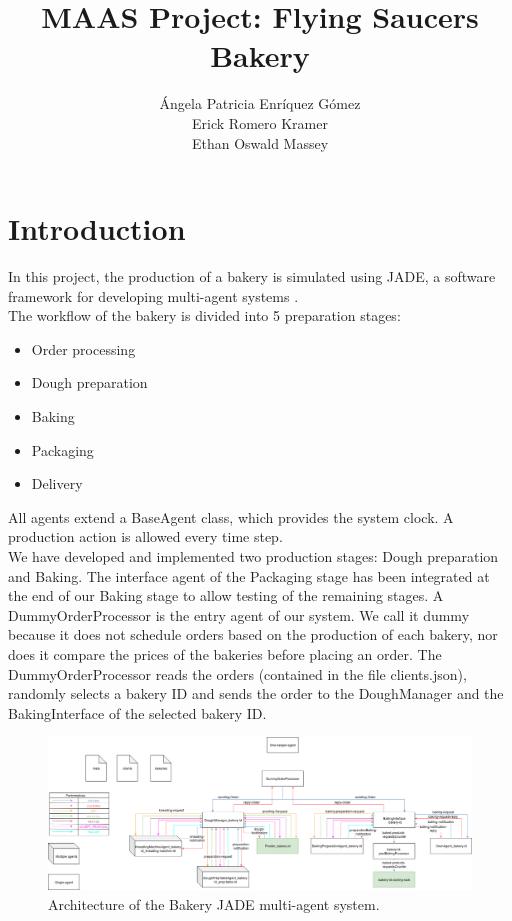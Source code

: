 \documentclass[paper=a4, fontsize=11pt]{scrartcl}
\title{MAAS Project: Flying Saucers Bakery}
\author{ \'{A}ngela Patricia Enr\'{i}quez G\'{o}mez \\
	Erick Romero Kramer \\
	Ethan Oswald Massey }
\begin{document}
	\maketitle

	\section{Introduction}

	In this project, the production of a bakery is simulated using JADE, a software framework for developing multi-agent systems \cite{Bellifemine}. \\

	The workflow of the bakery is divided into 5 preparation stages:

	\begin{itemize}
		\item Order processing
		\item Dough preparation
		\item Baking
		\item Packaging
		\item Delivery
	\end{itemize}

	All agents extend a BaseAgent class, which provides the system clock. A production action is allowed every time step. \\

	We have developed and implemented two production stages: Dough preparation and Baking. The interface agent of the Packaging stage has been integrated at the end of our Baking stage to allow testing of the remaining stages. A DummyOrderProcessor is the entry agent of our system. We call it dummy because it does not schedule orders based on the production of each bakery, nor does it compare the prices of the bakeries before placing an order. The DummyOrderProcessor reads the orders (contained in the file clients.json), randomly selects a bakery ID and sends the order to the DoughManager and the BakingInterface of the selected bakery ID. \\


\begin{landscape}

	\begin{figure}
	\centering
	\includegraphics[width=1\linewidth]{images/architecture}
	\caption{Architecture of the Bakery JADE multi-agent system.}
	\label{fig:architecture}
	\end{figure}

\end{landscape}
\end{document}
